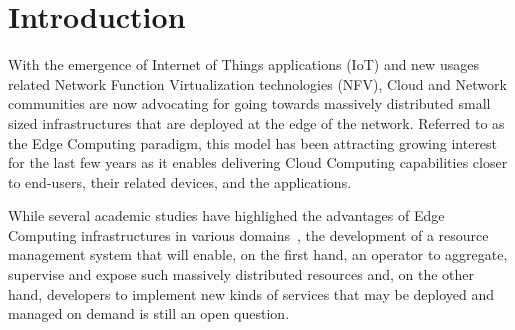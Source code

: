 
\section{Introduction}
\label{sec:intro}


With the emergence of Internet of Things applications (IoT) and new
usages related Network Function
Virtualization technologies (NFV), Cloud and Network communities are now advocating
for going towards massively distributed small sized infrastructures
that are deployed at the edge of the network.
%
Referred to as the Edge Computing paradigm, this model has been attracting
growing interest for the last few years as it enables delivering Cloud
Computing capabilities closer to end-users, their related devices, and the applications.
%

While several academic studies have highlighed the advantages of Edge
Computing infrastructures in various
domains~\cite{bonomi2012fog,zhang2015cloud,7574435,satyanarayanan2017emergence},
the development of
a resource management system that will enable, on the first hand,
an operator to aggregate, supervise and expose such massively
distributed resources and, on the other hand, developers to implement
new kinds of services that may be deployed and managed on demand is
still an open question.

